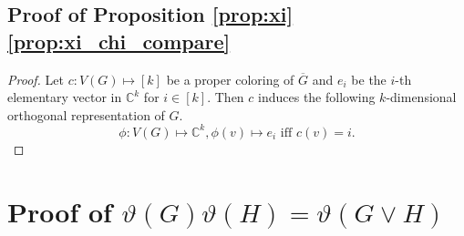 \documentclass[journal, onecolumn, draftcls]{IEEEtran}
\theoremstyle{definition}
\newcommand{\bbC}{\mathbb{C}}
\begin{document}
\subsection{Proof of Proposition \ref{prop:xi} \ref{prop:xi_chi_compare}}
\begin{proof}
Let $c:V(G)\mapsto[k]$ be a proper coloring of $\overline{G}$ and $e_i$ be the $i$-th elementary vector in $\bbC^{k}$ for $i\in[k]$. Then $c$ induces the following $k$-dimensional orthogonal representation of $G$.
$$
\phi:V(G)\mapsto \bbC^{k}, \phi(v)\mapsto e_i\text{ iff }c(v) = i.
$$
\end{proof}
 
\section{Proof of $\vartheta(G)\vartheta(H)=\vartheta(G\lor H)$}\label{app:vartheta_multiplicity}
\end{document}
